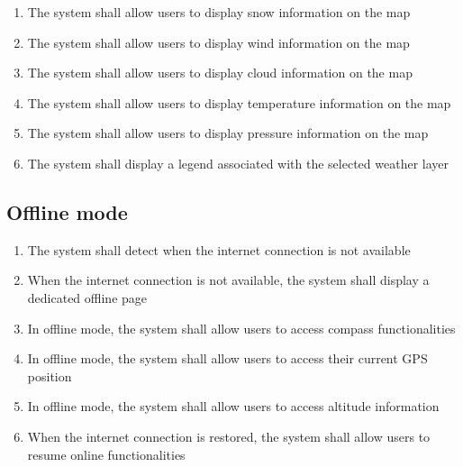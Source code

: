 \begin{enumerate}[label=\textbf{FR\arabic*}, ref=FR\arabic*, resume]
\item \label{fr-smartphone:fr74}
The system shall allow users to display snow information on the map

\item \label{fr-smartphone:fr75}
The system shall allow users to display wind information on the map

\item \label{fr-smartphone:fr76}
The system shall allow users to display cloud information on the map

\item \label{fr-smartphone:fr77}
The system shall allow users to display temperature information on the map

\item \label{fr-smartphone:fr78}
The system shall allow users to display pressure information on the map

\item \label{fr-smartphone:fr79}
The system shall display a legend associated with the selected weather layer

\end{enumerate}

\subsection{Offline mode}

\begin{enumerate}[label=\textbf{FR\arabic*}, ref=FR\arabic*, resume]

\item \label{fr-smartphone:offline-detect}
The system shall detect when the internet connection is not available


\item \label{fr-smartphone:offline-page}
When the internet connection is not available, the system shall display a dedicated offline page

\item \label{fr-smartphone:offline-compass}
In offline mode, the system shall allow users to access compass functionalities

\item \label{fr-smartphone:offline-position}
In offline mode, the system shall allow users to access their current GPS position

\item \label{fr-smartphone:offline-altitude}
In offline mode, the system shall allow users to access altitude information

\item \label{fr-smartphone:offline-restore}
When the internet connection is restored, the system shall allow users to resume online functionalities

\end{enumerate}

